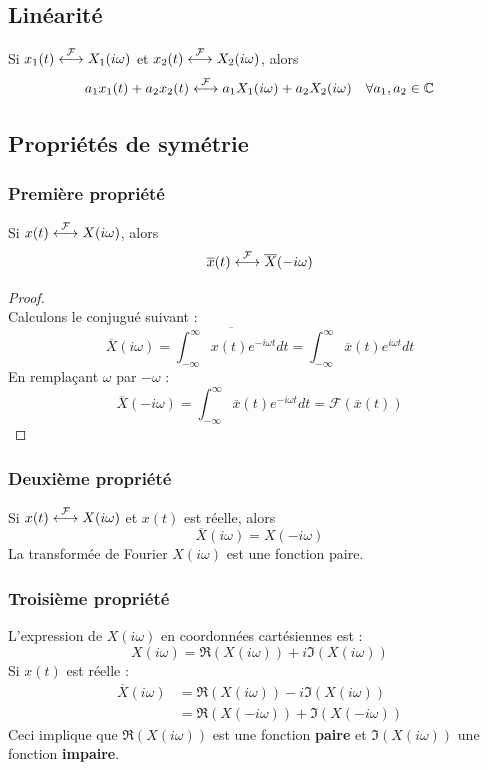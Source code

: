 \subsection{Linéarité}
Si $x_1(t) \ft X_1(i\omega)$ et $x_2(t) \ft X_2(i\omega)$, alors 
\begin{equation}
	a_1x_1(t) + a_2x_2(t) \ft a_1X_1(i\omega) + a_2X_2(i\omega)\ \ \
	\forall a_1,a_2 \in \mathbb{C}
\end{equation}
	
\subsection{Propriétés de symétrie}
\subsubsection{Première propriété}
Si $x(t) \ft X(i\omega)$, alors
\begin{equation}
	\overline{x}(t) \ft \overline{X}(-i\omega)
\end{equation}	
\begin{proof}\ \\
	Calculons le conjugué suivant :
	\begin{equation}
		\overline{X}(i\omega) = \overline{\int_{-\infty}^\infty x(t)e^{-
			i\omega t}dt} = \int_{-\infty}^\infty \overline{x}(t)e^{i\omega t}dt
	\end{equation}	
	En remplaçant $\omega$ par $-\omega$ :
	\begin{equation}
		\overline{X}(-i\omega) = \int_{-\infty}^\infty \overline{x}(t)e^{-i
			\omega t}dt = \mathcal{F}(\overline{x}(t))
	\end{equation}
\end{proof}
	
\subsubsection{Deuxième propriété}
Si $x(t) \ft X(i\omega)$ et $x(t)$ est réelle, alors 	
\begin{equation}
	\overline{X}(i\omega) = X(-i\omega)
\end{equation}
La transformée de Fourier $X(i\omega)$ est une fonction paire.
	
\subsubsection{Troisième propriété}
L'expression de $X(i\omega)$ en coordonnées cartésiennes est : 
\begin{equation}
	X(i\omega) = \Re(X(i\omega)) + i\Im(X(i\omega))
\end{equation}
Si $x(t)$ est réelle :
\begin{equation}
	\begin{array}{ll}
		\overline{X}(i\omega) & = \Re(X(i\omega))-i\Im                
		(X(i\omega))\\
		                      & = \Re(X(-i\omega)) + \Im(X(-i\omega)) 
	\end{array}
\end{equation}
Ceci implique que $\Re(X(i\omega))$ est une fonction 
\textbf{paire} et $\Im(X(i\omega))$ une fonction 
\textbf{impaire}.
	
